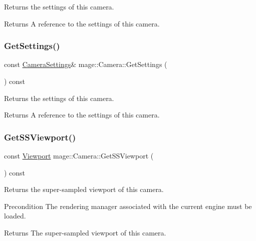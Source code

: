 Returns the settings of this camera.

\begin{DoxyReturn}{Returns}
A reference to the settings of this camera. 
\end{DoxyReturn}
\hypertarget{classmage_1_1_camera_a0174b0d44d749a678acb388b4a60b8c9}{}\label{classmage_1_1_camera_a0174b0d44d749a678acb388b4a60b8c9} 
\subsubsection{\texorpdfstring{Get\+Settings()}{GetSettings()}\hspace{0.1cm}{\footnotesize\ttfamily [2/2]}}
{\footnotesize\ttfamily const \hyperlink{classmage_1_1_camera_settings}{Camera\+Settings}\& mage\+::\+Camera\+::\+Get\+Settings (\begin{DoxyParamCaption}{ }\end{DoxyParamCaption}) const\hspace{0.3cm}{\ttfamily [noexcept]}}

Returns the settings of this camera.

\begin{DoxyReturn}{Returns}
A reference to the settings of this camera. 
\end{DoxyReturn}
\hypertarget{classmage_1_1_camera_aa82c733bd7c71518fa4c0b189f87277f}{}\label{classmage_1_1_camera_aa82c733bd7c71518fa4c0b189f87277f} 
\subsubsection{\texorpdfstring{Get\+S\+S\+Viewport()}{GetSSViewport()}}
{\footnotesize\ttfamily const \hyperlink{classmage_1_1_viewport}{Viewport} mage\+::\+Camera\+::\+Get\+S\+S\+Viewport (\begin{DoxyParamCaption}{ }\end{DoxyParamCaption}) const\hspace{0.3cm}{\ttfamily [noexcept]}}

Returns the super-\/sampled viewport of this camera.

\begin{DoxyPrecond}{Precondition}
The rendering manager associated with the current engine must be loaded. 
\end{DoxyPrecond}
\begin{DoxyReturn}{Returns}
The super-\/sampled viewport of this camera. 
\end{DoxyReturn}
\hypertarget{classmage_1_1_camera_a73deec0aefd507ec97da36069917f97c}{}\label{classmage_1_1_camera_a73deec0aefd507ec97da36069917f97c} 
